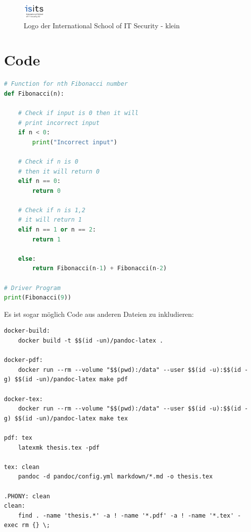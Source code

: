 \documentclass[
  11pt,
  a4paper,
  openright,
  cleardoublepage=plain,
  parskip=half+, %
]{scrreprt}
\begin{document}
\begin{figure}
\centering
\includegraphics[width=0.1\textwidth,height=\textheight]{././data/logo/isits-logo.jpg}
\caption{Logo der International School of IT Security -
klein}\label{fig:logo-isits-small}
\end{figure}

\section{Code}\label{code}

\begin{lstlisting}[language=Python, caption={Fibonacci-Algorithmus in Python}, label={alg:fibonacci-python}]
# Function for nth Fibonacci number
def Fibonacci(n):
   
    # Check if input is 0 then it will
    # print incorrect input
    if n < 0:
        print("Incorrect input")
 
    # Check if n is 0
    # then it will return 0
    elif n == 0:
        return 0
 
    # Check if n is 1,2
    # it will return 1
    elif n == 1 or n == 2:
        return 1
 
    else:
        return Fibonacci(n-1) + Fibonacci(n-2)
 
# Driver Program
print(Fibonacci(9))
\end{lstlisting}

Es ist sogar möglich Code aus anderen Dateien zu inkludieren:

\begin{lstlisting}[caption=Makefile, label={alg:makefile}]
docker-build:
	docker build -t $$(id -un)/pandoc-latex .

docker-pdf:
	docker run --rm --volume "$$(pwd):/data" --user $$(id -u):$$(id -g) $$(id -un)/pandoc-latex make pdf

docker-tex:
	docker run --rm --volume "$$(pwd):/data" --user $$(id -u):$$(id -g) $$(id -un)/pandoc-latex make tex

pdf: tex
	latexmk thesis.tex -pdf

tex: clean
	pandoc -d pandoc/config.yml markdown/*.md -o thesis.tex

.PHONY: clean
clean:
	find . -name 'thesis.*' -a ! -name '*.pdf' -a ! -name '*.tex' -exec rm {} \;
\end{lstlisting}
\end{document}
